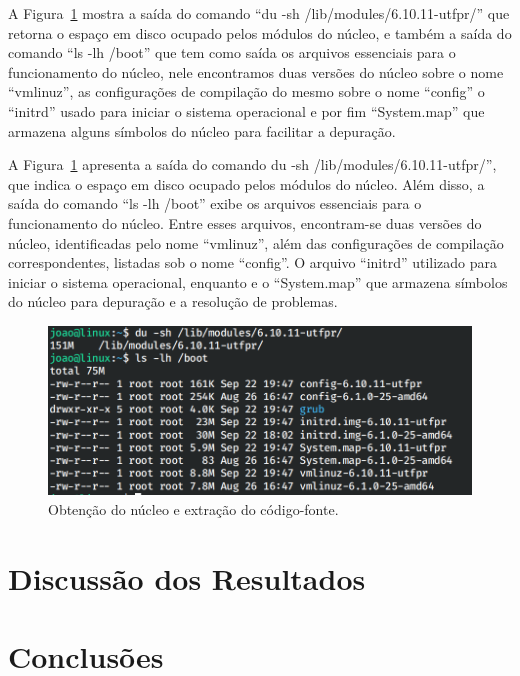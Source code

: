 \documentclass[
	12pt,				%
	oneside,   	        %
	a4paper,			%
	english,			%
	french,				%
	spanish,			%
	brazil,				%
	]{pacotes/abntex2}
\begin{document}
A Figura~\ref{fig:boot} mostra a saída do comando ``du -sh /lib/modules/6.10.11-utfpr/'' que retorna o espaço em disco ocupado pelos módulos do núcleo, e também a saída do comando ``ls -lh /boot'' que tem como saída os arquivos essenciais para o funcionamento do núcleo, nele encontramos duas versões do núcleo sobre o nome ``vmlinuz'', as configurações de compilação do mesmo sobre o nome ``config'' o ``initrd'' usado para iniciar o sistema operacional e por fim ``System.map'' que armazena alguns símbolos do núcleo para facilitar a depuração.

A Figura~\ref{fig:boot} apresenta a saída do comando du -sh /lib/modules/6.10.11-utfpr/'', que indica o espaço em disco ocupado pelos módulos do núcleo. Além disso, a saída do comando ``ls -lh /boot'' exibe os arquivos essenciais para o funcionamento do núcleo. Entre esses arquivos, encontram-se duas versões do núcleo, identificadas pelo nome ``vmlinuz'', além das configurações de compilação correspondentes, listadas sob o nome ``config''. O arquivo ``initrd'' utilizado para iniciar o sistema operacional, enquanto e o ``System.map'' que armazena símbolos do núcleo para depuração e a resolução de problemas.

\begin{figure}[H]
  \centering
  \includegraphics[scale=0.3]{figuras/boot.png}
  \caption{Obtenção do núcleo e extração do código-fonte.}
  \label{fig:boot}
\end{figure}



\section{Discussão dos Resultados}
\label{sec:discussao}

\section{Conclusões}
\label{sec:conclusoes}
\end{document}
